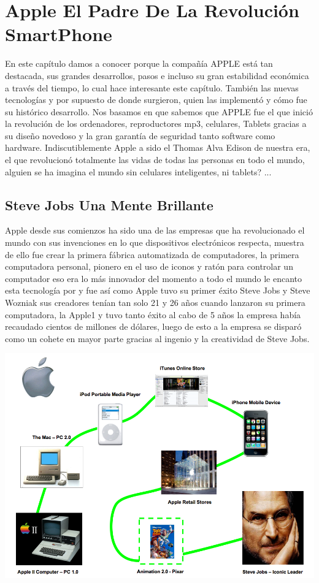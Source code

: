 \chapter*{Apple El Padre De La Revolución SmartPhone}
En este capítulo damos a conocer porque la compañía APPLE está tan destacada, sus grandes desarrollos, pasos e incluso su gran estabilidad económica a través del tiempo, lo 
cual hace interesante este capítulo. También las nuevas tecnologías y por supuesto de donde surgieron, quien las implementó y cómo fue su histórico desarrollo.  Nos basamos  
en que sabemos que APPLE fue el que inició la revolución de los ordenadores, reproductores mp3, celulares, Tablets gracias a su diseño novedoso y la gran garantía de 
seguridad tanto software como hardware. Indiscutiblemente Apple a sido el Thomas Alva Edison de nuestra era, el que revolucionó totalmente las vidas de todas las personas en 
todo el mundo, alguien se ha imagina el mundo sin celulares inteligentes, ni tablets? ...

\section*{Steve Jobs Una Mente Brillante}
Apple desde sus comienzos ha sido una de las empresas que ha revolucionado el mundo con sus invenciones en lo que dispositivos electrónicos respecta,  muestra de ello fue 
crear  la primera fábrica automatizada de computadores, la primera computadora personal, pionero en el uso de iconos y   ratón para controlar un computador eso era lo más 
innovador del momento a todo el mundo le encanto esta tecnología por y fue así como Apple tuvo su primer éxito Steve Jobs y Steve Wozniak sus creadores tenían tan solo 21 y 
26 años cuando lanzaron su primera computadora, la Apple1 y tuvo tanto éxito al cabo de 5 años la empresa había recaudado cientos de millones de dólares, luego de esto a la 
empresa se disparó como un cohete  en mayor parte gracias al ingenio y la creatividad de Steve Jobs. 

\includegraphics[scale=0.4]{img/cp08/img0801.png}

